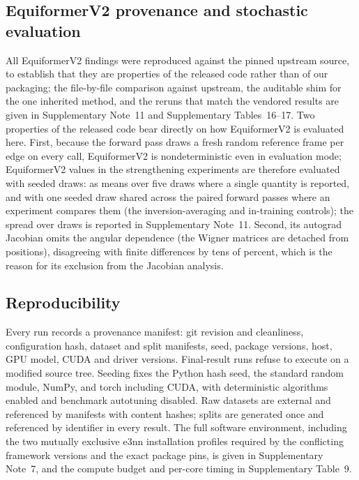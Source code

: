 \subsection*{EquiformerV2 provenance and stochastic evaluation}

All EquiformerV2 findings were reproduced against the pinned upstream source, to establish that they are properties of the released code rather than of our packaging; the file-by-file comparison against upstream, the auditable shim for the one inherited method, and the reruns that match the vendored results are given in Supplementary Note~11 and Supplementary Tables~16--17. Two properties of the released code bear directly on how EquiformerV2 is evaluated here. First, because the forward pass draws a fresh random reference frame per edge on every call, EquiformerV2 is nondeterministic even in evaluation mode; EquiformerV2 values in the strengthening experiments are therefore evaluated with seeded draws: as means over five draws where a single quantity is reported, and with one seeded draw shared across the paired forward passes where an experiment compares them (the inversion-averaging and in-training controls); the spread over draws is reported in Supplementary Note~11. Second, its autograd Jacobian omits the angular dependence (the Wigner matrices are detached from positions), disagreeing with finite differences by tens of percent, which is the reason for its exclusion from the Jacobian analysis.

\subsection*{Reproducibility}

Every run records a provenance manifest: git revision and cleanliness, configuration hash, dataset and split manifests, seed, package versions, host, GPU model, CUDA and driver versions. Final-result runs refuse to execute on a modified source tree. Seeding fixes the Python hash seed, the standard random module, NumPy, and torch including CUDA, with deterministic algorithms enabled and benchmark autotuning disabled. Raw datasets are external and referenced by manifests with content hashes; splits are generated once and referenced by identifier in every result. The full software environment, including the two mutually exclusive e3nn installation profiles required by the conflicting framework versions and the exact package pins, is given in Supplementary Note~7, and the compute budget and per-core timing in Supplementary Table~9.

